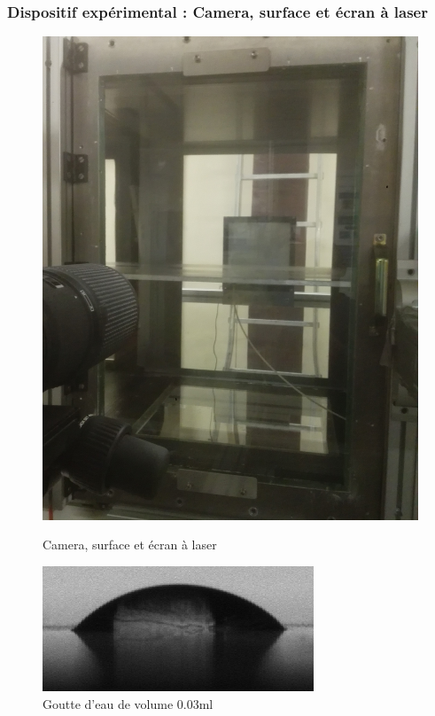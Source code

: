 \documentclass{beamer}
\begin{document}
\begin{frame}
\frametitle{Dispositif expérimental : Camera, surface et écran à laser}
\begin{figure}[!ht]
	\centering
	\begin{minipage}{0.4\linewidth}
		\includegraphics[width = \linewidth]{./image/Surface.jpg}
		\caption{Camera, surface et écran à laser}
	\end{minipage}
	\hfill
	\begin{minipage}{0.4\linewidth}
		\includegraphics[width=\linewidth]
		{./image/crop_vitesse=28_volume=003.png}
		\caption{Goutte d'eau de volume $0.03$ml}
	\end{minipage}
\end{figure}
\end{frame}
\end{document}
